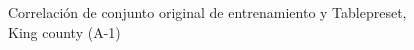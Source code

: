 \begin{figure}[H]
    \centering
    
    \caption{Correlación de conjunto original de entrenamiento y Tablepreset, King county (A-1)}
    \label{pairwise-king county-a-1-tablepreset}
\end{figure}